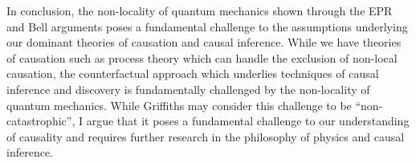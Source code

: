 \documentclass[11pt, a4paper]{article}
\begin{document}
In conclusion, the non-locality of quantum mechanics shown through the 
EPR and Bell arguments poses a fundamental challenge to the assumptions
underlying our dominant theories of causation and causal inference. While we
have theories of causation such as process theory which can handle the exclusion
of non-local causation, the counterfactual approach which underlies
techniques of causal inference and discovery is fundamentally challenged by the
non-locality of quantum mechanics. While Griffiths may consider this challenge 
to be ``non-catastrophic'', I argue that it poses a fundamental challenge to our
understanding of causality and requires further research in the philosophy of
physics and causal inference.


\end{document}
